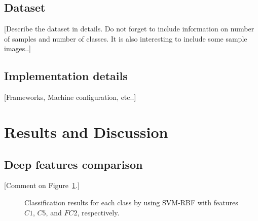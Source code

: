 \documentclass[10pt,conference]{IEEEtran}
\newcommand{\jef}[1]{\textcolor[rgb]{1,0,0}{[#1]}}
\begin{document}
\subsection{Dataset}

\jef{Describe the dataset in details. Do not forget to include information on number of samples and number of classes. It is also interesting to include some sample images.\vspace{6cm}.}

\subsection{Implementation details}

\jef{Frameworks, Machine configuration, etc.\vspace{6cm}.}

\section{Results and Discussion}

\subsection{Deep features comparison}

\jef{Comment on Figure~\ref{fig:feat_comp}.\vspace{3cm}}

\begin{figure}[h!]
	\centering
	\scriptsize
	\hspace{1mm}
	\hspace{1mm}
	\caption{Classification results for each class by using SVM-RBF with features $C1$, $C5$, and $FC2$, respectively.}
	\label{fig:feat_comp}
\end{figure}
\end{document}
